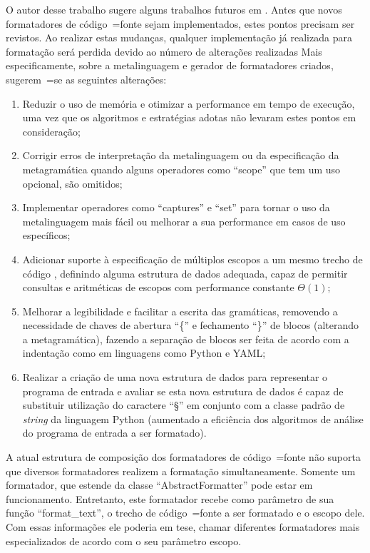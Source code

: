 O autor desse trabalho sugere alguns trabalhos futuros em .
Antes que novos formatadores de código~=fonte sejam implementados,
estes pontos precisam ser revistos.
Ao realizar estas mudanças,
qualquer implementação já realizada para formatação será perdida devido ao número de alterações realizadas Mais especificamente,
sobre a metalinguagem e
gerador de formatadores criados,
sugerem~=se as seguintes alterações:
\begin{enumerate}
\item Reduzir o uso de memória e
otimizar a performance em tempo de execução,
uma vez que os algoritmos e
estratégias adotas não levaram estes pontos em consideração;
\item Corrigir erros de interpretação da metalinguagem ou
da especificação da metagramática quando alguns operadores como ``scope'' que tem um uso opcional,
são omitidos;
\item Implementar operadores como ``captures'' e
``set'' para tornar o uso da metalinguagem mais fácil ou
melhorar a sua performance em casos de uso específicos;
\item Adicionar suporte à especificação de múltiplos escopos a um mesmo trecho de código \cite{vsCodeSyntaxHighlighthing},
definindo alguma estrutura de dados adequada,
capaz de permitir consultas e
aritméticas de escopos \cite{textMateScopeExclusion} com performance constante $\Theta(1)$;
\item Melhorar a legibilidade e
facilitar a escrita das gramáticas,
removendo a necessidade de chaves de abertura ``\{'' e
fechamento ``\}'' de blocos (alterando a metagramática),
fazendo a separação de blocos ser feita de acordo com a indentação como em linguagens como Python e
YAML;
\item Realizar a criação de uma nova estrutura de dados para representar o programa de entrada e
avaliar se esta nova estrutura de dados é capaz de substituir utilização do caractere ``§'' em conjunto com a classe padrão de \textit{string} da linguagem Python (aumentado a eficiência dos algoritmos de análise do programa de entrada a ser formatado).
\end{enumerate}%

A atual estrutura de composição dos formatadores de código~=fonte não suporta que diversos formatadores realizem a formatação simultaneamente.
Somente um formatador,
que estende da classe ``AbstractFormatter'' pode estar em funcionamento.
Entretanto,
este formatador recebe como parâmetro de sua função ``format\_text'',
o trecho de código~=fonte a ser formatado e
o escopo dele.
Com essas informações ele poderia em tese,
chamar diferentes formatadores mais especializados de acordo com o seu parâmetro escopo.

